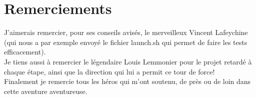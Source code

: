 \documentclass{article}
\begin{document}
\section{Remerciements}
J'aimerais remercier, pour ses conseils avisés, le merveilleux Vincent Lafeychine (qui nous a par exemple envoyé le fichier launch.sh qui permet de faire les tests efficacement).\\
Je tiens aussi à remercier le légendaire Louis Lemmonier pour le projet retardé à chaque étape, ainsi que la direction qui lui a permit ce tour de force! \\
Finalement je remercie tous les héros qui m'ont soutenu, de près ou de loin dans cette aventure aventureuse. 
\end{document}
